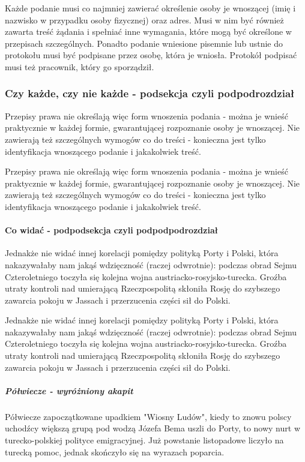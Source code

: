 Każde podanie musi co najmniej zawierać określenie osoby je wnoszącej
(imię i nazwisko w przypadku osoby fizycznej) oraz adres. Musi w nim być
również zawarta treść żądania i spełniać inne wymagania, które mogą być
określone w przepisach szczególnych. Ponadto podanie wniesione pisemnie
lub ustnie do protokołu musi być podpisane przez osobę, która je
wniosła. Protokół podpisać musi też pracownik, który go sporządził.

\subsubsection{Czy każde, czy nie każde - podsekcja czyli
podpodrozdział}

Przepisy prawa nie określają więc form wnoszenia podania - można je
wnieść praktycznie w każdej formie, gwarantującej rozpoznanie osoby je
wnoszącej. Nie zawierają też szczególnych wymogów co do treści -
konieczna jest tylko identyfikacja wnoszącego podanie i jakakolwiek
treść.

Przepisy prawa nie określają więc form wnoszenia podania - można je
wnieść praktycznie w każdej formie, gwarantującej rozpoznanie osoby je
wnoszącej. Nie zawierają też szczególnych wymogów co do treści -
konieczna jest tylko identyfikacja wnoszącego podanie i jakakolwiek
treść.

\paragraph{Co widać - podpodsekcja czyli podpodpodrozdział}

Jednakże nie widać innej korelacji pomiędzy polityką Porty i Polski,
która nakazywałaby nam jakąś wdzięczność (raczej odwrotnie): podczas
obrad Sejmu Czteroletniego toczyła się kolejna wojna
austriacko-rosyjsko-turecka. Groźba utraty kontroli nad umierającą
Rzeczpospolitą skłoniła Rosję do szybszego zawarcia pokoju w Jassach i
przerzucenia części sił do Polski.

Jednakże nie widać innej korelacji pomiędzy polityką Porty i Polski,
która nakazywałaby nam jakąś wdzięczność (raczej odwrotnie): podczas
obrad Sejmu Czteroletniego toczyła się kolejna wojna
austriacko-rosyjsko-turecka. Groźba utraty kontroli nad umierającą
Rzeczpospolitą skłoniła Rosję do szybszego zawarcia pokoju w Jassach i
przerzucenia części sił do Polski.

\subparagraph{Półwiecze - wyróżniony akapit}

Półwiecze zapoczątkowane upadkiem "Wiosny Ludów", kiedy to znowu polscy
uchodźcy większą grupą pod wodzą Józefa Bema uszli do Porty, to nowy
nurt w turecko-polskiej polityce emigracyjnej. Już powstanie listopadowe
liczyło na turecką pomoc, jednak skończyło się na wyrazach poparcia.

